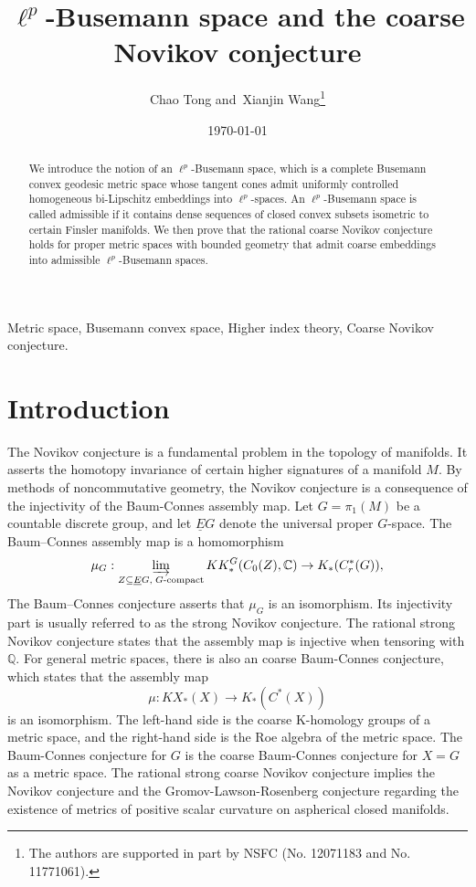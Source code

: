 \documentclass{article}
\theoremstyle{plain}
\theoremstyle{definition}
\theoremstyle{remark}
\begin{document}
	\title{$\ell^p$-Busemann space and the coarse Novikov conjecture}
	\vskip 16mm
	\author{Chao Tong and\ Xianjin Wang\footnote{The authors are supported in part by NSFC (No. 12071183 and No. 11771061).}
	}
	
	
	\date{\today}                                  
	\maketitle
	\begin{abstract}
	We introduce the notion of an \(\ell^p\)-Busemann space, which is a complete Busemann convex geodesic metric space whose tangent cones admit uniformly controlled homogeneous bi-Lipschitz embeddings into \(\ell^p\)-spaces. An \(\ell^p\)-Busemann space is called admissible if it contains dense sequences of closed convex subsets isometric to certain Finsler manifolds. We then prove that the rational coarse Novikov conjecture holds for proper metric spaces with bounded geometry that admit coarse embeddings into admissible \(\ell^p\)-Busemann spaces.
	\end{abstract}
	
	\par{} Metric space, Busemann convex space, Higher index theory, Coarse Novikov conjecture.
	
	
	\section{Introduction}
	The Novikov conjecture is a fundamental problem in the topology of manifolds. It asserts the homotopy invariance of certain higher signatures of a manifold $M$. By methods of noncommutative geometry, the Novikov conjecture is a consequence of the injectivity of the Baum-Connes assembly map. Let $G=\pi_1(M)$ be a countable discrete group, and let $\underline EG$ denote
	the universal proper $G$-space. The Baum--Connes assembly map is a
	homomorphism
	\[
	\mu_G:
	\varinjlim_{Z\subseteq \underline EG,\; G\text{-compact}}
	KK_*^G(C_0(Z),\mathbb C)
	\to
	K_*(C_r^*(G)),
	\]
	 The Baum--Connes
	conjecture asserts that $\mu_G$ is an isomorphism. Its injectivity
	part is usually referred to as the strong Novikov conjecture. The rational strong Novikov conjecture states that the assembly map is injective when tensoring with $\mathbb{Q}$. For general metric spaces, there is also an coarse Baum-Connes conjecture, which states that the assembly map $$\mu :KX_*(X)\to K_*(C^*(X))$$ 
	is an isomorphism. The left-hand side is the coarse K-homology groups of a metric space, and the right-hand side is the  Roe algebra of the metric space. The Baum-Connes conjecture for $G$ is the coarse Baum-Connes conjecture for $X=G$ as a metric space. The rational strong coarse Novikov conjecture implies the Novikov conjecture and the Gromov-Lawson-Rosenberg conjecture regarding the existence of metrics of positive scalar curvature on aspherical closed manifolds.
	
\end{document}
